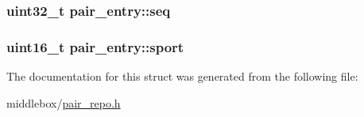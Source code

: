 \hypertarget{structpair__entry_a3fcc67f72e59d19137dfce53543542b2}{
\subsubsection[{seq}]{\setlength{\rightskip}{0pt plus 5cm}uint32\-\_\-t pair\-\_\-entry\-::seq}}\label{structpair__entry_a3fcc67f72e59d19137dfce53543542b2}
\hypertarget{structpair__entry_a8a5bd1e674f0da9d918390d1d4750552}{
\subsubsection[{sport}]{\setlength{\rightskip}{0pt plus 5cm}uint16\-\_\-t pair\-\_\-entry\-::sport}}\label{structpair__entry_a8a5bd1e674f0da9d918390d1d4750552}


The documentation for this struct was generated from the following file\-:\begin{DoxyCompactItemize}
\item 
middlebox/\hyperlink{pair__repo_8h}{pair\-\_\-repo.\-h}\end{DoxyCompactItemize}
